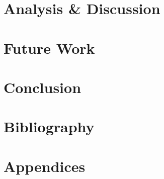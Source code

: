 \documentclass[a4paper,11pt]{article}
\begin{document}
\section{Analysis \& Discussion}

\section{Future Work}

\section{Conclusion}

\section{Bibliography}

\printbibliography{}

\section{Appendices}
\end{document}
